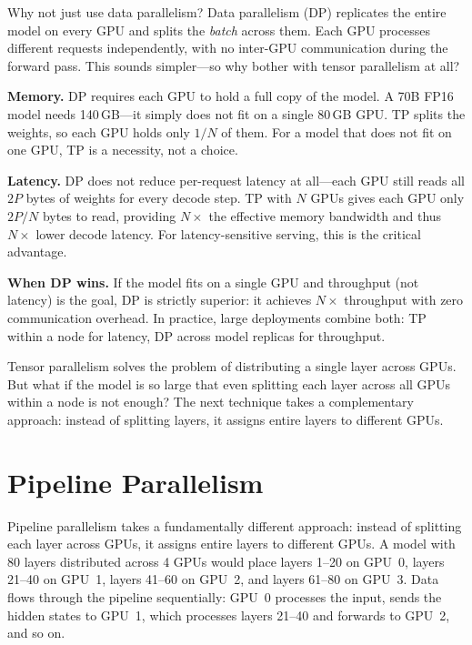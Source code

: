 \begin{whynotbox}{Why not just use data parallelism?}
Data parallelism (DP) replicates the entire model on every GPU and splits the \emph{batch} across them. Each GPU processes different requests independently, with no inter-GPU communication during the forward pass. This sounds simpler---so why bother with tensor parallelism at all?

\textbf{Memory.} DP requires each GPU to hold a full copy of the model. A 70B FP16 model needs 140\,GB---it simply does not fit on a single 80\,GB GPU. TP splits the weights, so each GPU holds only $1/N$ of them. For a model that does not fit on one GPU, TP is a necessity, not a choice.

\textbf{Latency.} DP does not reduce per-request latency at all---each GPU still reads all $2P$ bytes of weights for every decode step. TP with $N$ GPUs gives each GPU only $2P/N$ bytes to read, providing $N\times$ the effective memory bandwidth and thus $N\times$ lower decode latency. For latency-sensitive serving, this is the critical advantage.

\textbf{When DP wins.} If the model fits on a single GPU and throughput (not latency) is the goal, DP is strictly superior: it achieves $N\times$ throughput with zero communication overhead. In practice, large deployments combine both: TP within a node for latency, DP across model replicas for throughput.
\end{whynotbox}

Tensor parallelism solves the problem of distributing a single layer across GPUs. But what if the model is so large that even splitting each layer across all GPUs within a node is not enough? The next technique takes a complementary approach: instead of splitting layers, it assigns entire layers to different GPUs.

\section{Pipeline Parallelism}
\label{sec:distributed:pipeline}

%
Pipeline parallelism takes a fundamentally different approach: instead of splitting each layer across GPUs, it assigns entire layers to different GPUs. A model with 80 layers distributed across 4 GPUs would place layers 1--20 on GPU~0, layers 21--40 on GPU~1, layers 41--60 on GPU~2, and layers 61--80 on GPU~3. Data flows through the pipeline sequentially: GPU~0 processes the input, sends the hidden states to GPU~1, which processes layers 21--40 and forwards to GPU~2, and so on.

